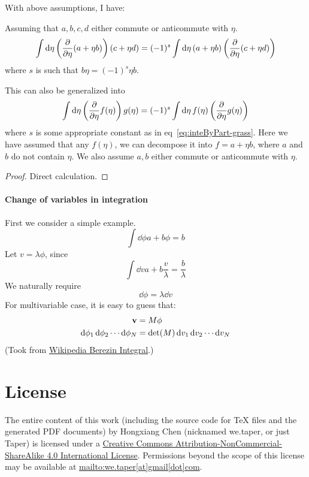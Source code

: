 \documentclass{article}
\begin{document}
With above assumptions, I have:
\begin{thm}
    Assuming that $a,b,c,d$ either commute or anticommute with $\eta$.
    \begin{equation}
        \int\dd{\eta} \left(\pdv{\eta}(a+\eta b) \right)(c+\eta d)
        = (-1)^s\int\dd{\eta} (a+\eta b) \left(\pdv{\eta}(c+\eta d)\right)
        \label{eq:inteByPart-grass}
    \end{equation}
    where $s$ is such that $b\eta = (-1)^s \eta b$.
\end{thm}
This can also be generalized into
\begin{equation}
    \int\dd{\eta} \left(\pdv{\eta}f(\eta) \right) g(\eta)
    = (-1)^s\int\dd{\eta} f(\eta) \left(\pdv{\eta}g(\eta)\right)
\end{equation}
where $s$ is some appropriate constant as in eq~\ref{eq:inteByPart-grass}. Here
we have assumed that any $f(\eta)$, we can decompose it into $f=a+\eta b$, where
$a$ and $b$ do not contain $\eta$. We also assume $a,b$ either commute or
anticommute with $\eta$.
\begin{proof}
    Direct calculation.
\end{proof}

\paragraph{Change of variables in integration}
First we consider a simple example.
\begin{equation}
    \int \dd{\phi} a+b\phi = b
\end{equation}
Let $v = \lambda \phi$, since
\begin{equation}
    \int\dd{v} a+ b\frac{v}{\lambda} = \frac{b}{\lambda}
\end{equation}
We naturally require
\begin{equation}
    \dd{\phi} = \lambda \dd{v}
\end{equation}
For multivariable case, it is easy to guess that:
\begin{align}
    \vb{v} &= M\vb{\phi} \\
    \dd{\phi_1}\dd{\phi_2}\cdots \dd{\phi_N} &= \det(M)\dd{v_1}\dd{v_2}\cdots\dd{v_N}
\end{align}
(Took from
\href{https://en.wikipedia.org/wiki/Berezin_integral#Change_of_Grassmann_variables}{Wikipedia
Berezin Integral}.)

\section{License}
The entire content of this work (including the source code
for TeX files and the generated PDF documents) by 
Hongxiang Chen (nicknamed we.taper, or just Taper) is
licensed under a 
\href{http://creativecommons.org/licenses/by-nc-sa/4.0/}{Creative 
Commons Attribution-NonCommercial-ShareAlike 4.0 International 
License}. Permissions beyond the scope of this 
license may be available at \url{mailto:we.taper[at]gmail[dot]com}.
{}


\printnomenclature
\end{document}
